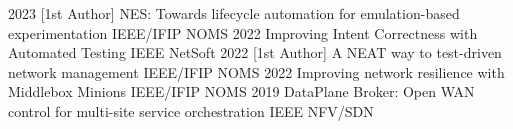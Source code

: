 \documentclass[9pt]{developercv} %
\begin{document}

\vspace{-1em}

\begin{entrylist}
	\pubentry
	{2023}
	{[1st Author]}
	{NES: Towards lifecycle automation for emulation-based experimentation}
	{IEEE/IFIP NOMS}
	\pubentry
	{2022}
	{}
	{Improving Intent Correctness with Automated Testing}
	{IEEE NetSoft}
	\pubentry
	{2022}
	{[1st Author]}
	{A NEAT way to test-driven network management}
	{IEEE/IFIP NOMS}
	\pubentry
	{2022}
	{}
	{Improving network resilience with Middlebox Minions}
	{IEEE/IFIP NOMS}
	\pubentry
	{2019}
	{}
	{DataPlane Broker: Open WAN control for multi-site service orchestration}
	{IEEE NFV/SDN}
\end{entrylist}

\end{document}
